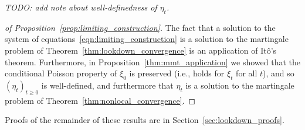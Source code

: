 \documentclass[EJP]{ejpecp} %
\newcommand{\lp}{\xi}              %
\newcommand{\comment}[1]{{\color{blue} \it #1}}
\begin{document}
\comment{TODO: add note about well-definedness of $\eta_t$.}

\begin{proof}[of Proposition~\ref{prop:limiting_construction}] 
    The fact that a solution to the system of equations~\eqref{eqn:limiting_construction}
    is a solution to the martingale problem of Theorem~\ref{thm:lookdown_convergence}
    is an application of It\^o's theorem.
    Furthermore, in Proposition~\ref{thm:mmt_application} we showed that
    the conditional Poisson property of $\lp_0$ is preserved
    (i.e., holds for $\lp_t$ for all $t$), and so
    $(\eta_t)_{t \ge 0}$ is well-defined,
    and furthermore that $\eta_t$ is a solution
    to the martingale problem of Theorem~\ref{thm:nonlocal_convergence}.
\end{proof}

Proofs of the remainder of these results are in Section~\ref{sec:lookdown_proofs}. 
\end{document}

